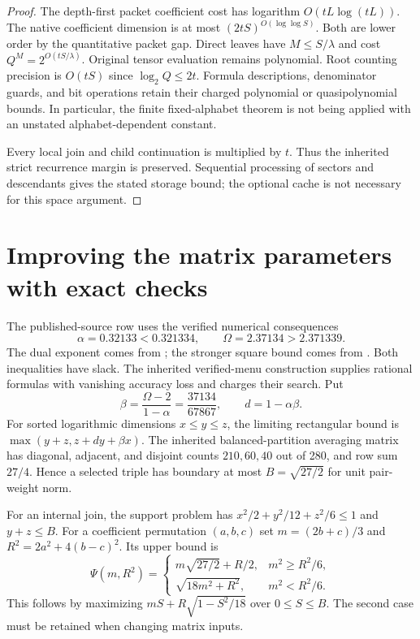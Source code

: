 \documentclass[11pt]{article}
\begin{document}
\begin{proof}
The depth-first packet coefficient cost has logarithm
$O(tL\log(tL))$. The native coefficient dimension is at most
$(2tS)^{O(\log\log S)}$. Both are lower order by the quantitative
packet gap. Direct leaves have $M\le S/\lambda$ and cost
$Q^M=2^{O(tS/\lambda)}$. Original tensor evaluation remains
polynomial. Root counting precision is $O(tS)$ since $\log_2Q\le2t$.
Formula descriptions, denominator guards, and bit operations retain
their charged polynomial or quasipolynomial bounds. In particular,
the finite fixed-alphabet theorem is not being applied with an
unstated alphabet-dependent constant.

Every local join and child continuation is multiplied by $t$.
Thus the inherited strict recurrence margin is preserved. Sequential
processing of sectors and descendants gives the stated storage bound;
the optional cache is not necessary for this space argument.
\end{proof}

\section{Improving the matrix parameters with exact checks}
The published-source row uses the verified numerical consequences
\[
 \alpha=0.32133<0.321334,\qquad
 \Omega=2.37134>2.371339.
\]
The dual exponent comes from \cite{wxxz}; the stronger square bound
comes from \cite{alman}. Both inequalities have slack. The inherited
verified-menu construction supplies rational formulas with vanishing
accuracy loss and charges their search. Put
\[
 \beta=\frac{\Omega-2}{1-\alpha}=\frac{37134}{67867},\qquad
 d=1-\alpha\beta.
\]
For sorted logarithmic dimensions $x\le y\le z$, the limiting
rectangular bound is $\max(y+z,z+dy+\beta x)$.
The inherited balanced-partition averaging matrix has diagonal,
adjacent, and disjoint counts $210,60,40$ out of 280, and row
sum $27/4$. Hence a selected triple has boundary at most
$B=\sqrt{27/2}$ for unit pair-weight norm.

For an internal join, the support problem has
$x^2/2+y^2/12+z^2/6\le1$ and $y+z\le B$.
For a coefficient permutation $(a,b,c)$ set
$m=(2b+c)/3$ and $R^2=2a^2+4(b-c)^2$. Its upper bound is
\[
 \Psi(m,R^2)=
 \begin{cases}
 m\sqrt{27/2}+R/2,&m^2\ge R^2/6,\\
 \sqrt{18m^2+R^2},&m^2<R^2/6.
 \end{cases}
\]
This follows by maximizing $mS+R\sqrt{1-S^2/18}$ over $0\le S\le B$.
The second case must be retained when changing matrix inputs.
\end{document}
